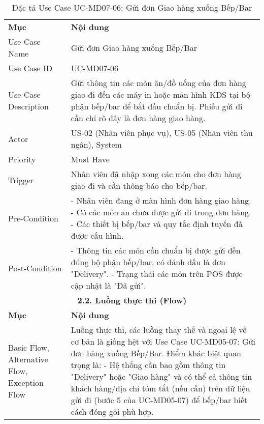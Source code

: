 \begin{longtable}{|m{4cm}|p{11cm}|}
\caption{Đặc tả Use Case UC-MD07-06: Gửi đơn Giao hàng xuống Bếp/Bar} \label{tab:uc_md07_06} \\
\hline

\endhead %
\hline
\endfoot %
\hline
\endlastfoot %
\multicolumn{2}{|c|}{\textbf{2.1. Tóm tắt (Summary)}} \\
\hline
\textbf{Mục} & \textbf{Nội dung} \\
\hline
Use Case Name & Gửi đơn Giao hàng xuống Bếp/Bar \\
\hline
Use Case ID & UC-MD07-06 \\
\hline
Use Case Description & Gửi thông tin các món ăn/đồ uống của đơn hàng giao đi đến các máy in hoặc màn hình KDS tại bộ phận bếp/bar để bắt đầu chuẩn bị. Phiếu gửi đi cần chỉ rõ đây là đơn hàng giao hàng. \\
\hline
Actor & US-02 (Nhân viên phục vụ), US-05 (Nhân viên thu ngân), System \\
\hline
Priority & Must Have \\
\hline
Trigger & Nhân viên đã nhập xong các món cho đơn hàng giao đi và cần thông báo cho bếp/bar. \\
\hline
Pre-Condition & - Nhân viên đang ở màn hình đơn hàng giao hàng. \newline - Có các món ăn chưa được gửi đi trong đơn hàng. \newline - Các thiết bị bếp/bar và quy tắc định tuyến đã được cấu hình. \\
\hline
Post-Condition & - Thông tin các món cần chuẩn bị được gửi đến đúng bộ phận bếp/bar, có đánh dấu là đơn "Delivery". \newline - Trạng thái các món trên POS được cập nhật là "Đã gửi". \\
\hline
\multicolumn{2}{|c|}{\textbf{2.2. Luồng thực thi (Flow)}} \\
\hline
\textbf{Mục} & \textbf{Nội dung} \\
\hline
Basic Flow, Alternative Flow, Exception Flow & Luồng thực thi, các luồng thay thế và ngoại lệ về cơ bản là giống hệt với Use Case UC-MD05-07: Gửi đơn hàng xuống Bếp/Bar. Điểm khác biệt quan trọng là: \newline - Hệ thống cần bao gồm thông tin "Delivery" hoặc "Giao hàng" và có thể cả thông tin khách hàng/địa chỉ tóm tắt (nếu cần) trên dữ liệu gửi đi (bước 5 của UC-MD05-07) để bếp/bar biết cách đóng gói phù hợp. \\

\end{longtable}
